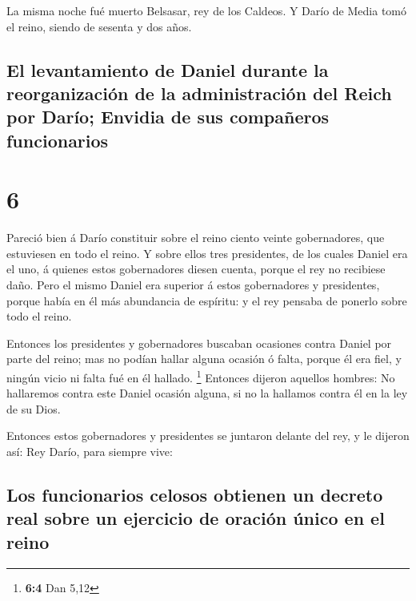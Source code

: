  La misma noche fué muerto Belsasar, rey de los Caldeos.
 Y Darío de Media tomó el reino, siendo de sesenta y dos
años.

\hypertarget{el-levantamiento-de-daniel-durante-la-reorganizaciuxf3n-de-la-administraciuxf3n-del-reich-por-daruxedo-envidia-de-sus-compauxf1eros-funcionarios}{%
\subsection{El levantamiento de Daniel durante la reorganización de la
administración del Reich por Darío; Envidia de sus compañeros
funcionarios}\label{el-levantamiento-de-daniel-durante-la-reorganizaciuxf3n-de-la-administraciuxf3n-del-reich-por-daruxedo-envidia-de-sus-compauxf1eros-funcionarios}}

\hypertarget{section-5}{%
\section{6}\label{section-5}}

 Pareció bien á Darío constituir sobre el reino ciento
veinte gobernadores, que estuviesen en todo el reino.  Y
sobre ellos tres presidentes, de los cuales Daniel era el uno, á quienes
estos gobernadores diesen cuenta, porque el rey no recibiese daño.
 Pero el mismo Daniel era superior á estos gobernadores y
presidentes, porque había en él más abundancia de espíritu: y el rey
pensaba de ponerlo sobre todo el reino.

 Entonces los presidentes y gobernadores buscaban
ocasiones contra Daniel por parte del reino; mas no podían hallar alguna
ocasión ó falta, porque él era fiel, y ningún vicio ni falta fué en él
hallado. \footnote{\textbf{6:4} Dan 5,12}  Entonces
dijeron aquellos hombres: No hallaremos contra este Daniel ocasión
alguna, si no la hallamos contra él en la ley de su Dios.

 Entonces estos gobernadores y presidentes se juntaron
delante del rey, y le dijeron así: Rey Darío, para siempre vive:

\hypertarget{los-funcionarios-celosos-obtienen-un-decreto-real-sobre-un-ejercicio-de-oraciuxf3n-uxfanico-en-el-reino}{%
\subsection{Los funcionarios celosos obtienen un decreto real sobre un
ejercicio de oración único en el
reino}\label{los-funcionarios-celosos-obtienen-un-decreto-real-sobre-un-ejercicio-de-oraciuxf3n-uxfanico-en-el-reino}}

